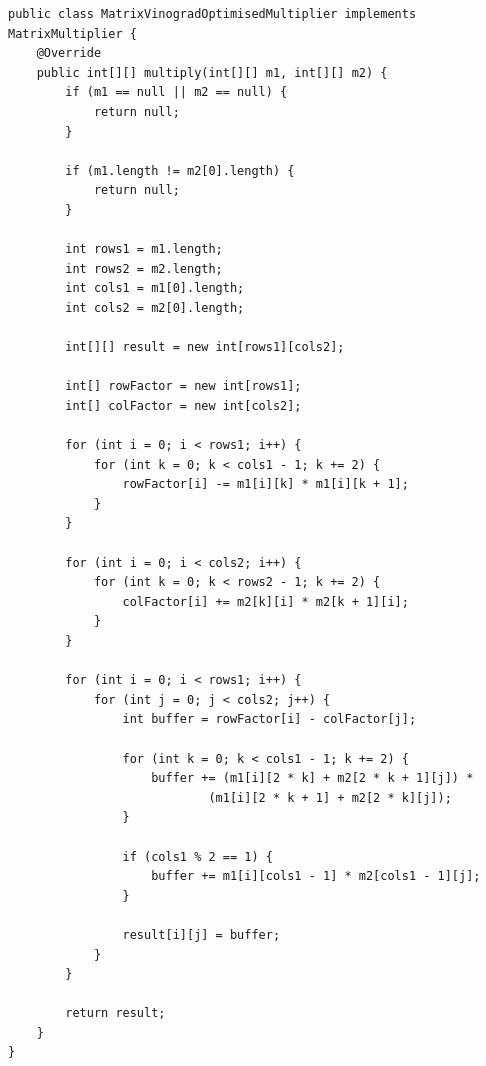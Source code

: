 \documentclass[12pt]{report}
\begin{document}
    \begin{lstlisting}[caption=Оптимизированный алгоритм Копперсмита-Винограда, label={lst:optVinograd}]
public class MatrixVinogradOptimisedMultiplier implements MatrixMultiplier {
    @Override
    public int[][] multiply(int[][] m1, int[][] m2) {
        if (m1 == null || m2 == null) {
            return null;
        }

        if (m1.length != m2[0].length) {
            return null;
        }

        int rows1 = m1.length;
        int rows2 = m2.length;
        int cols1 = m1[0].length;
        int cols2 = m2[0].length;

        int[][] result = new int[rows1][cols2];

        int[] rowFactor = new int[rows1];
        int[] colFactor = new int[cols2];

        for (int i = 0; i < rows1; i++) {
            for (int k = 0; k < cols1 - 1; k += 2) {
                rowFactor[i] -= m1[i][k] * m1[i][k + 1];
            }
        }

        for (int i = 0; i < cols2; i++) {
            for (int k = 0; k < rows2 - 1; k += 2) {
                colFactor[i] += m2[k][i] * m2[k + 1][i];
            }
        }

        for (int i = 0; i < rows1; i++) {
            for (int j = 0; j < cols2; j++) {
                int buffer = rowFactor[i] - colFactor[j];

                for (int k = 0; k < cols1 - 1; k += 2) {
                    buffer += (m1[i][2 * k] + m2[2 * k + 1][j]) *
                            (m1[i][2 * k + 1] + m2[2 * k][j]);
                }

                if (cols1 % 2 == 1) {
                    buffer += m1[i][cols1 - 1] * m2[cols1 - 1][j];
                }

                result[i][j] = buffer;
            }
        }

        return result;
    }
}
    \end{lstlisting}
\end{document}
